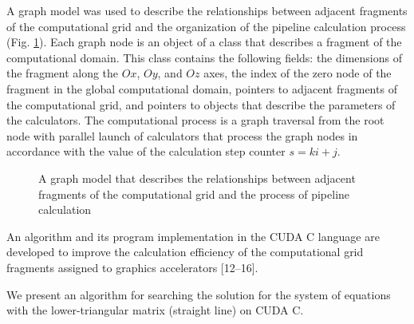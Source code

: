 \documentclass{svproc}
\begin{document}
A graph model was used to describe the relationships between adjacent fragments of the computational grid and the organization of the pipeline calculation process (Fig. \ref{fig3}). Each graph node is an object of a class that describes a fragment of the computational domain. This class contains the following fields: the dimensions of the fragment along the $Ox$, $Oy$, and $Oz$ axes, the index of the zero node of the fragment in the global computational domain, pointers to adjacent fragments of the computational grid, and pointers to objects that describe the parameters of the calculators. The computational process is a graph traversal from the root node with parallel launch of calculators that process the graph nodes in accordance with the value of the calculation step counter $s=ki+j$.

\begin{figure}[h!]
	\caption{A graph model that describes the relationships between adjacent fragments of the computational grid and the process of pipeline calculation} \label{fig3}
\end{figure}

An algorithm and its program implementation in the CUDA C language are developed to improve the calculation efficiency of the computational grid fragments assigned to graphics accelerators [12--16].

We present an algorithm for searching the solution for the system of equations with the lower-triangular matrix (straight line) on CUDA C. 
\end{document}
